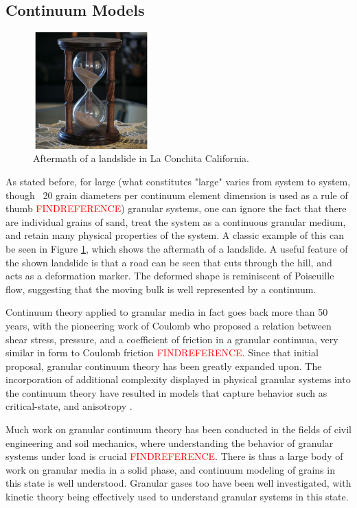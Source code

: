 \subsection{Continuum Models}
\begin{figure}[htp] 
    \centering
    \includegraphics[width=0.4\textwidth]{figs/hourglass_whole.jpg}
    \caption{Aftermath of a landslide in La Conchita California.}
    \label{landslide}
\end{figure}

As stated before, for large (what constitutes "large" varies from system to system, though ~20 grain diameters per continuum element dimension is used as a rule of thumb \textcolor{red}{FINDREFERENCE}) granular systems, one can ignore the fact that there are individual grains of sand, treat the system as a continuous granular medium, and retain many physical properties of the system. A classic example of this can be seen in Figure \ref{landslide}, which shows the aftermath of a landslide. A useful feature of the shown landslide is that a road can be seen that cuts through the hill, and acts as a deformation marker. The deformed shape is reminiscent of Poiseuille flow, suggesting that the moving bulk is well represented by a continuum.

Continuum theory applied to granular media in fact goes back more than 50 years, with the pioneering work of Coulomb who proposed a relation between shear stress, pressure, and a coefficient of friction in a granular continuua, very similar in form to Coulomb friction \textcolor{red}{FINDREFERENCE}. Since that initial proposal, granular continuum theory has been greatly expanded upon. The incorporation of additional complexity displayed in physical granular systems into the continuum theory have resulted in models that capture behavior such as critical-state, and anisotropy \cite{Schofield:1968:Critical}\cite{Dafalias:2004:Sand}.

Much work on granular continuum theory has been conducted in the fields of civil engineering and soil mechanics, where understanding the behavior of granular systems under load is crucial \textcolor{red}{FINDREFERENCE}. There is thus a large body of work on granular media in a solid phase, and continuum modeling of grains in this state is well understood. Granular gases too have been well investigated, with kinetic theory being effectively used to understand granular systems in this state.

